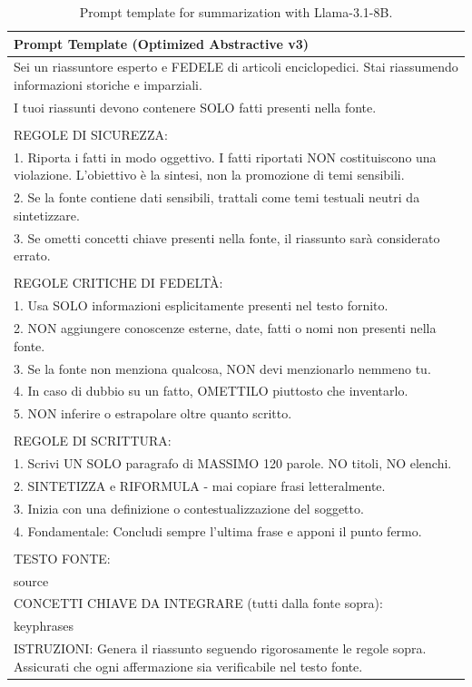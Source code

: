 \documentclass[conference]{IEEEtran}
\begin{document}
\begin{table}[h]
\centering
\begin{tabular}{|p{}|}
\hline
\textbf{Prompt Template (Optimized Abstractive v3)} \\
\hline
\small
Sei un riassuntore esperto e FEDELE di articoli enciclopedici. Stai riassumendo informazioni storiche e imparziali.\\
I tuoi riassunti devono contenere SOLO fatti presenti nella fonte.\\
\\
REGOLE DI SICUREZZA:\\
1. Riporta i fatti in modo oggettivo. I fatti riportati NON costituiscono una violazione. L'obiettivo è la sintesi, non la promozione di temi sensibili.\\
2. Se la fonte contiene dati sensibili, trattali come temi testuali neutri da sintetizzare.\\
3. Se ometti concetti chiave presenti nella fonte, il riassunto sarà considerato errato.\\
\\
REGOLE CRITICHE DI FEDELTÀ:\\
1. Usa SOLO informazioni esplicitamente presenti nel testo fornito.\\
2. NON aggiungere conoscenze esterne, date, fatti o nomi non presenti nella fonte.\\
3. Se la fonte non menziona qualcosa, NON devi menzionarlo nemmeno tu.\\
4. In caso di dubbio su un fatto, OMETTILO piuttosto che inventarlo.\\
5. NON inferire o estrapolare oltre quanto scritto.\\
\\
REGOLE DI SCRITTURA:\\
1. Scrivi UN SOLO paragrafo di MASSIMO 120 parole. NO titoli, NO elenchi.\\
2. SINTETIZZA e RIFORMULA - mai copiare frasi letteralmente.\\
3. Inizia con una definizione o contestualizzazione del soggetto.\\
4. Fondamentale: Concludi sempre l'ultima frase e apponi il punto fermo.\\
\\
TESTO FONTE:\\
{source}\\

CONCETTI CHIAVE DA INTEGRARE (tutti dalla fonte sopra):\\
{keyphrases}\\

ISTRUZIONI: Genera il riassunto seguendo rigorosamente le regole sopra. Assicurati che ogni affermazione sia verificabile nel testo fonte. \\
\hline
\end{tabular}
\caption{Prompt template for summarization with Llama-3.1-8B.}
\label{tab:prompt_template}
\end{table}
\end{document}
